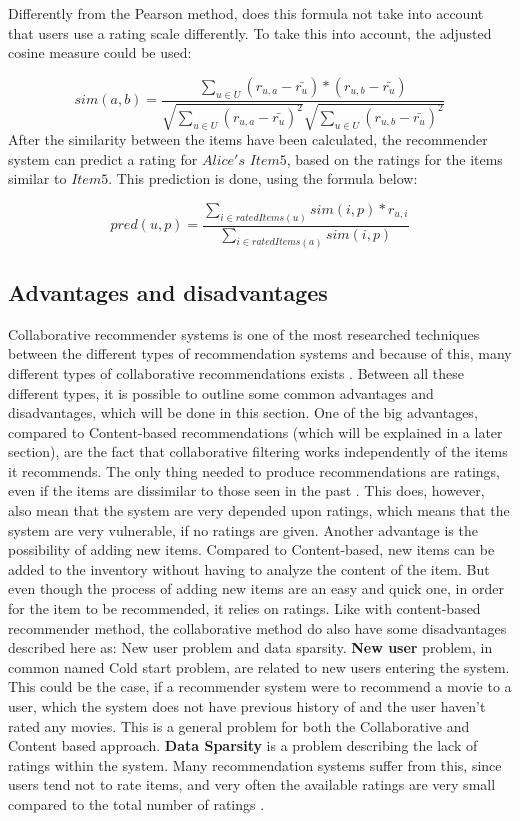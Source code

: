 Differently from the Pearson method, does this formula not take into account that users use a rating scale differently. To take this into account, the adjusted cosine measure could be used:

\[
	sim(a,b) = \frac{\sum_{u \in U}(r_{u,a} - \bar{r_{u}})*(r_{u,b} - \bar{r_{u}})}{\sqrt{\sum_{u \in U}(r_{u,a} - \bar{r_{u}})^2}\sqrt{\sum_{u \in U} (r_{u,b} - \bar{r_{u}})^2}}
\]
After the similarity between the items have been calculated, the recommender system can predict a rating for \(Alice's\) \(Item5\), based on the ratings for the items similar to \(Item5\). This prediction is done, using the formula below:

\[
	pred(u,p) = \frac{\sum_{i\in ratedItems(u)} sim(i,p) * r_{u,i}}{\sum_{i \in ratedItems(a)} sim(i,p)}
\]


\subsection{Advantages and disadvantages}
Collaborative recommender systems is one of the most researched techniques between the different types of recommendation systems and because of this, many different types of collaborative recommendations exists \citep{IntroductionRecommenderSystems}. Between all these different types, it is possible to outline some common advantages and disadvantages, which will be done in this section.\newline
One of the big advantages, compared to Content-based recommendations (which will be explained in a later section), are the fact that collaborative filtering works independently of the items it recommends. The only thing needed to produce recommendations are ratings, even if the items are dissimilar to those seen in the past \citep[p. 18]{TowardsTheNextGenerationOfRs}. This does, however, also mean that the system are very depended upon ratings, which means that the system are very vulnerable, if no ratings are given. Another advantage is the possibility of adding new items. Compared to Content-based, new items can be added to the inventory without having to analyze the content of the item. But even though the process of adding new items are an easy and quick one, in order for the item to be recommended, it relies on ratings.\newline 
Like with content-based recommender method, the collaborative method do also have some disadvantages described here as: New user problem and data sparsity.\newline
\textbf{New user} problem, in common named Cold start problem, are related to new users entering the system. This could be the case, if a recommender system were to recommend a movie to a user, which the system does not have previous history of and the user haven't rated any movies. This is a general problem for both the Collaborative and Content based approach. \newline
\textbf{Data Sparsity} is a problem describing the lack of ratings within the system. Many recommendation systems suffer from this, since users tend not to rate items, and very often the available ratings are very small compared to the total number of ratings \citep[p. 19]{TowardsTheNextGenerationOfRs}. 
